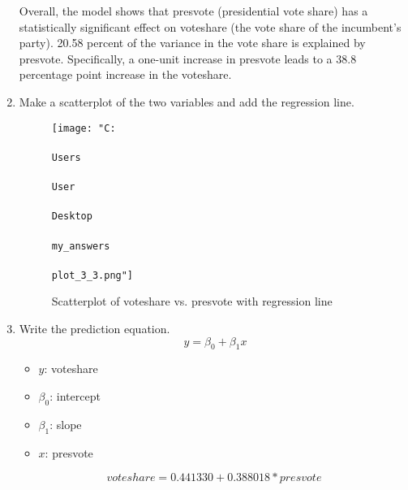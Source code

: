 \documentclass[12pt,letterpaper]{article}
\begin{document}
\begin{enumerate}
\begin{Verbatim}
	\end{Verbatim}
	Overall, the model shows that presvote (presidential vote share) has a statistically significant effect on voteshare (the vote share of the incumbent's party). 20.58 percent  of the variance in the vote share is explained by presvote. Specifically, a one-unit increase in presvote leads to a 38.8 percentage point increase in the voteshare.
			\vspace{0.5cm}
		\item Make a scatterplot of the two variables and add the regression line.
		
			\vspace{0.5cm}
			\begin{figure}[h!]
				\centering
			\texttt{[image: "C:\\\\Users\\\\User\\\\Desktop\\\\my\_answers\\\\plot\_3\_3.png"]}
			\caption{Scatterplot of voteshare vs. presvote with regression line}
			\label{fig:plot_3}
			\end{figure}
			\vspace{10cm}
		\item Write the prediction equation.
		\vspace{.25cm}
		\begin{equation}
			\ y = \beta_0 + \beta_1 x
			\end{equation}
			\begin{itemize}
				\item \( y \): voteshare
				\item \(\beta_0\): intercept
				\item \(\beta_1 \): slope
				\item \( x \): presvote
			\end{itemize}
			\begin{equation}
				voteshare = 0.441330+0.388018*presvote
			\end{equation}
		
	\end{enumerate}
	
\end{document}
